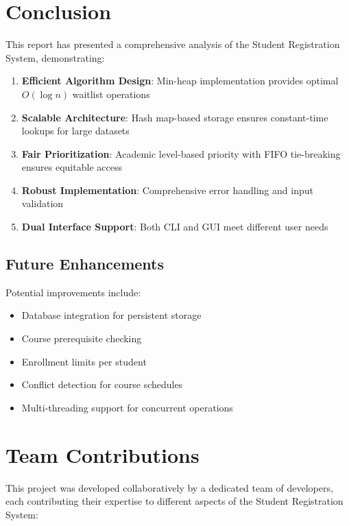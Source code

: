 \documentclass[12pt,a4paper]{article}
\begin{document}
\section{Conclusion}

This report has presented a comprehensive analysis of the Student Registration System, demonstrating:

\begin{enumerate}
    \item \textbf{Efficient Algorithm Design}: Min-heap implementation provides optimal $O(\log n)$ waitlist operations
    \item \textbf{Scalable Architecture}: Hash map-based storage ensures constant-time lookups for large datasets
    \item \textbf{Fair Prioritization}: Academic level-based priority with FIFO tie-breaking ensures equitable access
    \item \textbf{Robust Implementation}: Comprehensive error handling and input validation
    \item \textbf{Dual Interface Support}: Both CLI and GUI meet different user needs
\end{enumerate}

\subsection{Future Enhancements}
Potential improvements include:
\begin{itemize}
    \item Database integration for persistent storage
    \item Course prerequisite checking
    \item Enrollment limits per student
    \item Conflict detection for course schedules
    \item Multi-threading support for concurrent operations
\end{itemize}

\section{Team Contributions}

This project was developed collaboratively by a dedicated team of developers, each contributing their expertise to different aspects of the Student Registration System:
\end{document}
